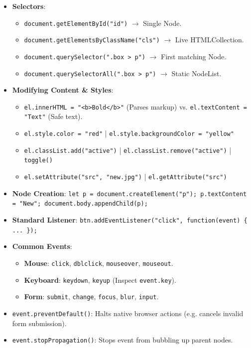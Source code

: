 \documentclass[a4paper,11pt]{article}
\begin{document}
\begin{handwbox}
\begin{itemize}[leftmargin=*]
    \item \textbf{Selectors}:
    \begin{itemize}
        \item \texttt{document.getElementById("id")} $\to$ Single Node.
        \item \texttt{document.getElementsByClassName("cls")} $\to$ Live HTMLCollection.
        \item \texttt{document.querySelector(".box > p")} $\to$ First matching Node.
        \item \texttt{document.querySelectorAll(".box > p")} $\to$ Static NodeList.
    \end{itemize}
    \item \textbf{Modifying Content \& Styles}:
    \begin{itemize}
        \item \texttt{el.innerHTML = "<b>Bold</b>"} (Parses markup) vs. \texttt{el.textContent = "Text"} (Safe text).
        \item \texttt{el.style.color = "red"} | \texttt{el.style.backgroundColor = "yellow"}
        \item \texttt{el.classList.add("active")} | \texttt{el.classList.remove("active")} | \texttt{toggle()}
        \item \texttt{el.setAttribute("src", "new.jpg")} | \texttt{el.getAttribute("src")}
    \end{itemize}
    \item \textbf{Node Creation}: \texttt{let p = document.createElement("p"); p.textContent = "New"; document.body.appendChild(p);}
\end{itemize}
\end{handwbox}

\begin{conceptbox}
\begin{itemize}[leftmargin=*]
    \item \textbf{Standard Listener}: \texttt{btn.addEventListener("click", function(event) \{ ... \});}
    \item \textbf{Common Events}:
    \begin{itemize}
        \item \textbf{Mouse}: \texttt{click}, \texttt{dblclick}, \texttt{mouseover}, \texttt{mouseout}.
        \item \textbf{Keyboard}: \texttt{keydown}, \texttt{keyup} (Inspect \texttt{event.key}).
        \item \textbf{Form}: \texttt{submit}, \texttt{change}, \texttt{focus}, \texttt{blur}, \texttt{input}.
    \end{itemize}
    \item \texttt{event.preventDefault()}: Halts native browser actions (e.g. cancels invalid form submission).
    \item \texttt{event.stopPropagation()}: Stops event from bubbling up parent nodes.
\end{itemize}
\end{conceptbox}
\end{document}
